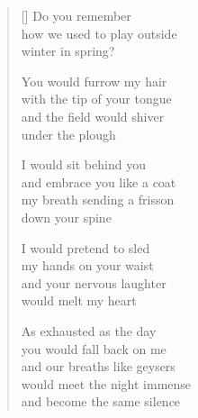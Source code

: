 \documentclass[12pt,a4paper]{article}
\begin{document}
\begin{verse}[\versewidth]
  Do you remember \\
  how we used to play outside \\
  winter in spring?

  You would furrow my hair \\
  with the tip of your tongue \\
  and the field would shiver \\
  under the plough

  I would sit behind you \\
  and embrace you like a coat \\
  my breath sending a frisson \\
  down your spine

  I would pretend to sled \\
  my hands on your waist \\
  and your nervous laughter \\
  would melt my heart

  As exhausted as the day \\
  you would fall back on me \\
  and our breaths like geysers \\
  would meet the night immense \\
  and become the same silence
\end{verse}
\end{document}
